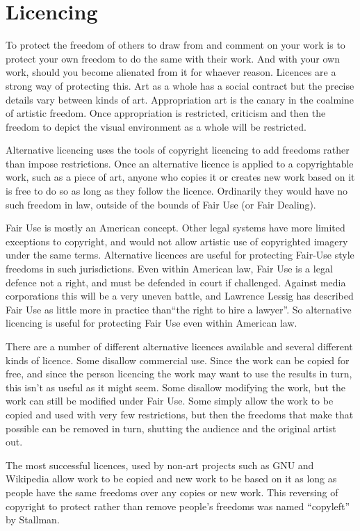 \documentclass[11pt, a4]{article}
\let\footnote=\endnote
\begin{document}
\section{Licencing}

To protect the freedom of others to draw from and comment on your work is to protect your own freedom to do the same with their work. And with your own work, should you become alienated from it for whaever reason. Licences are a strong way of protecting this. Art as a whole has a social contract but the precise details vary between kinds of art. Appropriation art is the canary in the coalmine of artistic freedom. Once appropriation is restricted, criticism and then the freedom to depict the visual environment as a whole will be restricted.

Alternative licencing uses the tools of copyright licencing to add freedoms rather than impose restrictions. Once an alternative licence is applied to a copyrightable work, such as a piece of art, anyone who copies it or creates new work based on it is free to do so as long as they follow the licence. Ordinarily they would have no such freedom in law, outside of the bounds of Fair Use (or Fair Dealing).

Fair Use is mostly an American concept. Other legal systems have more limited exceptions to copyright, and would not allow artistic use of copyrighted imagery under the same terms. Alternative licences are useful for protecting Fair-Use style freedoms in such jurisdictions. Even within American law, Fair Use is a legal defence not a right, and must be defended in court if challenged. Against media corporations this will be a very uneven battle, and Lawrence Lessig has described Fair Use as little more in practice than``the right to hire a lawyer''\cite{Lessig2004}. So alternative licencing is useful for protecting Fair Use even within American law.

There are a number of different alternative licences available and several different kinds of licence. Some disallow commercial use. Since the work can be copied for free, and since the person licencing the work may want to use the results in turn, this isn't as useful as it might seem. Some disallow modifying the work, but the work can still be modified under Fair Use. Some simply allow the work to be copied and used with very few restrictions, but then the freedoms that make that possible can be removed in turn, shutting the audience and the original artist out.

The most successful licences, used by non-art projects such as GNU \footnote{See: \url{http://www.gnu.org/}} and Wikipedia \footnote{See: \url{http://wikipedia.org/}} allow work to be copied and new work to be based on it as long as people have the same freedoms over any copies or new work. This reversing of copyright to protect rather than remove people's freedoms was named ``copyleft'' by Stallman. 
\end{document}
